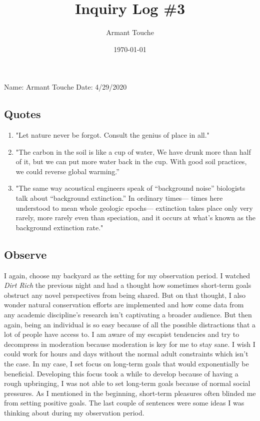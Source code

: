\documentclass[a4paper,man,biblatex]{apa6}
\title{Inquiry Log \#3}
\author{Armant Touche}
\affiliation{Portland State University}
\date{\today}
\begin{document}
\thispagestyle{otherpage}
\setcounter{biburllcpenalty}{7000}
\setcounter{biburlucpenalty}{8000}


\noindent Name: Armant Touche\newline
\noindent Date: 4/29/2020

\subsection{Quotes}
\begin{enumerate}
    \item "Let nature never be forgot. Consult the genius of place in all." \autocite{dirtrich}
    \item "The carbon in the soil is like a cup of water, We have drunk more than half of it, but we can put more water back in the cup. With good soil practices, we could reverse global warming.” \autocite{soilsave}
    \item "The  same  way  acoustical  engineers  speak  of  “background  noise”  biologists talk about “background extinction.” In ordinary times— times here understood to mean whole geologic epochs— extinction takes place only very rarely, more rarely even than speciation, and it occurs at what’s known as the background extinction rate." \autocite{sixthsextinct} 

\end{enumerate}

\subsection{Observe} I again, choose my backyard as the setting for my observation period. I watched \textit{Dirt Rich} the previous night and had a thought how sometimes short-term goals obstruct any novel perspectives from being shared. But on that thought, I also wonder natural conservation efforts are implemented and how come data from any academic discipline's research isn't captivating a broader audience. But then again, being an individual is so easy because of all the possible distractions that a lot of people have access to. I am aware of my escapist tendencies and try to decompress in moderation because moderation is key for me to stay sane. I wish I could work for hours and days without the normal adult constraints which isn't the case. In my case, I set focus on long-term goals that would exponentially be beneficial. Developing this focus took a while to develop because of having a rough upbringing, I was not able to set long-term goals because of normal social pressures. As I mentioned in the beginning, short-term pleasures often blinded me from setting positive goals. The last couple of sentences were some ideas I was thinking about during my observation period.
\end{document}
